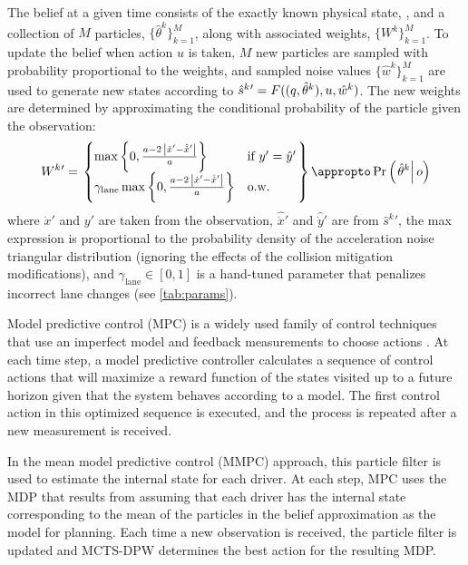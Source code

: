 The belief at a given time consists of the exactly known physical state, \phys, and a collection of $M$ particles, $\{\hat{\theta}^k\}_{k=1}^M$, along with associated weights, $\{W^k\}_{k=1}^M$.
To update the belief when action $u$ is taken, $M$ new particles are sampled with probability proportional to the weights, and sampled noise values $\{\hat{w}^k\}_{k=1}^M$ are used to generate new states according to ${\hat{s}^k}{'} = F((q, \hat{\theta}^k), u, \hat{w}^k)$.
The new weights are determined by approximating the conditional probability of the particle given the observation:
\begin{equation*}
{W^k}{'} = \left.
\begin{cases}
    \max\left\{0, \frac{a - 2 \, \left| \dot{x}' - \hat{\dot{x}}' \right|}{a} \right\} & \text{if } y' = \hat{y}' \\
\gamma_\text{lane} \max\left\{0, \frac{a - 2 \, \left| \dot{x}' - \hat{\dot{x}}' \right|}{a} \right\} & \text{o.w.}
\end{cases} \right\} \appropto \operatorname{Pr}\left(\left.\hat{\theta}^k \right| o \right)
\end{equation*}
where $\dot{x}'$ and $y'$ are taken from the observation, $\hat{\dot{x}}'$ and $\hat{\dot{y}}'$ are from ${\hat{s}^k}{'}$, the max expression is proportional to the probability density of the acceleration noise triangular distribution (ignoring the effects of the collision mitigation modifications), and $\gamma_\text{lane} \in [0,1]$ is a hand-tuned parameter that penalizes incorrect lane changes (see \cref{tab:params}).


Model predictive control (MPC) is a widely used family of control techniques that use an imperfect model and feedback measurements to choose actions \cite{garcia1989model}. At each time step, a model predictive controller calculates a sequence of control actions that will maximize a reward function of the states visited up to a future horizon given that the system behaves according to a model. The first control action in this optimized sequence is executed, and the process is repeated after a new measurement is received.

In the mean model predictive control (MMPC) approach, this particle filter is used to estimate the internal state for each driver. At each step, MPC uses the MDP that results from assuming that each driver has the internal state corresponding to the mean of the particles in the belief approximation as the model for planning. Each time a new observation is received, the particle filter is updated and MCTS-DPW determines the best action for the resulting MDP.


